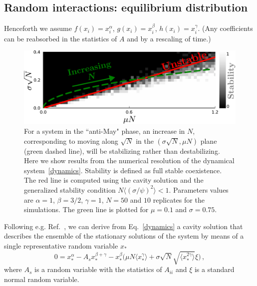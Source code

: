 \documentclass[
 pre,
 twocolumn,
 amsmath,
 amssymb,
 aps,
]{revtex4-2}
\begin{document}
\subsection{Random interactions: equilibrium distribution}Henceforth we assume $f(x_i)=x_i^{\alpha}$, $g(x_i)=x_i^{\beta}$, $h(x_i)=x_i^{\gamma}$. 
(Any coefficients can be reabsorbed in the statistics of $A$ and by a rescaling of time.)
\begin{figure}[t!]
    \includegraphics[width=.45\textwidth]{beta1_5-S50-N10-diversity-increase.pdf}
    \caption{For a system in the ``anti-May" phase, an increase in $N$,
    corresponding to moving along $\sqrt{N}$ in the $(\sigma \sqrt{N},\mu N)$ plane (green dashed line), will be stabilizing rather than destabilizing.
    Here we show results from the numerical resolution of the dynamical system~\eqref{dynamics}. Stability is defined as full stable coexistence. The red line is computed using the cavity solution and the generalized stability condition $N\langle (\sigma/\psi)^2\rangle < 1$.
    Parameters values are $\alpha=1$, $\beta=3/2$,
    $\gamma=1$, $N=50$ and $10$ replicates for the simulations. The green line is plotted for $\mu=0.1$ and $\sigma=0.75$.}
    \label{fig: stability line + sims}
\end{figure}
Following e.g. Ref.~\cite{Roy2019}, we can derive from Eq.~\eqref{dynamics} a cavity solution that describes the ensemble of the stationary solutions of the system by means of a single representative random variable $x_*$
\begin{equation}
    0 = x_*^{\alpha}-A_sx_*^{\beta+\gamma}-x_*^{\beta}\big( \mu N \langle x_*^{\gamma}\rangle + \sigma\sqrt{N} \sqrt{\langle x_*^{2\gamma}\rangle}\xi\big) \, ,
\label{eq: dmft}
\end{equation}
where $A_s$ is a random variable with the statistics of $A_{ii}$ and $\xi$ is a standard normal random variable. 
\end{document}
